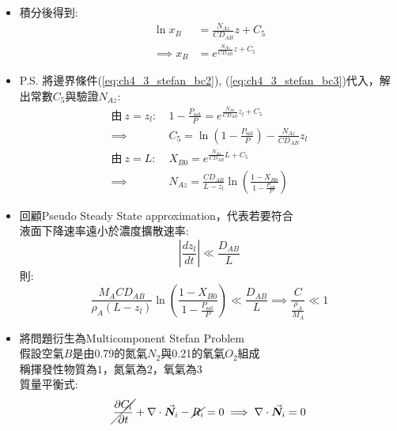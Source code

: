 \documentclass[../main.tex]{subfiles}
\begin{document}
\begin{itemize}
\begin{equation}
    N_{Bz} = x_B\left(N_{Az} + \cancel{N_{Bz}}\right) - C D_{AB} \frac{dx_B}{dz} = 0
  \end{equation}
  可以得到
  \begin{equation}
    \frac{1}{x_B} dx_B = \frac{N_{Az}}{C D_{AB}} dz
  \end{equation}
  \item 積分後得到:
  \begin{align}
    \ln x_B &= \frac{N_{Az}}{C D_{AB}} z + C_5 \nonumber\\
    \implies x_B &= e^{\frac{N_{Az}}{C D_{AB}} z + C_5}
  \end{align}
  \item P.S. 將邊界條件(\ref{eq:ch4_3_stefan_bc2}), (\ref{eq:ch4_3_stefan_bc3})代入，解出常數$C_5$與驗證$N_{Az}$:
  \begin{align}
    \text{由}~z=z_l:~& 1 - \frac{P_{\text{sat}}}{P} = e^{\frac{N_{Az}}{C D_{AB}} z_l + C_5} \nonumber\\
    \implies & C_5 = \ln\left(1 - \frac{P_{\text{sat}}}{P}\right) - \frac{N_{Az}}{C D_{AB}} z_l \\
    \text{由}~z=L:~& X_{B0} = e^{\frac{N_{Az}}{C D_{AB}} L + C_5} \nonumber\\
    \implies & N_{Az} = \frac{C D_{AB}}{L - z_l} \ln\left(\frac{1 - X_{B0}}{1 - \frac{P_{\text{sat}}}{P}}\right)
  \end{align}
  \item 回顧Pseudo Steady State approximation，代表若要符合\\
  液面下降速率遠小於濃度擴散速率:
  \begin{equation}
    \left|\frac{dz_l}{dt}\right| \ll \frac{D_{AB}}{L}
  \end{equation}
  則:
  \begin{equation}
    \frac{M_A C D_{AB}}{\rho_A (L - z_l)} \ln\left(\frac{1 - X_{B0}}{1 - \frac{P_{\text{sat}}}{P}}\right) \ll \frac{D_{AB}}{L} \implies
    \frac{C}{\frac{\rho_A}{M_A}} \ll 1
  \end{equation}
  \item 將問題衍生為Multicomponent Stefan Problem\\
  假設空氣$B$是由0.79的氮氣$N_2$與0.21的氧氣$O_2$組成\\
  稱揮發性物質為$1$，氮氣為$2$，氧氣為$3$\\
  質量平衡式:
  \begin{equation}
    \cancel{\frac{\partial C_i}{\partial t}} + \nabla \cdot \vec{\bm N_i} - \cancel{R_i} = 0 \implies \nabla \cdot \vec{\bm N_i} = 0
  \end{equation}

\end{itemize}
\end{document}
